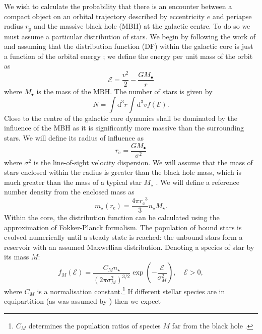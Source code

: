 \documentclass[useAMS,usedcolumn,usegraphicx,usenatbib]{mn2e}
\newcommand{\sub}[1]{\ensuremath{_\mathrm{#1}}}
\newcommand{\dd}{\ensuremath{\mathrm{d}}}
\begin{document}
We wish to calculate the probability that there is an encounter between a compact object on an orbital trajectory described by eccentricity $e$ and periapse radius $r\sub{p}$ and the massive black hole (MBH) at the galactic centre. To do so we must assume a particular distribution of stars. We begin by following the work of \citet{Bahcall1976, Bahcall1977} and assuming that the distribution function (DF) within the galactic core is just a function of the orbital energy \citep{Shapiro1978}; we define the energy per unit mass of the orbit as
\begin{equation}
\mathcal{E} = \frac{v^2}{2} - \frac{GM_\bullet}{r}
\end{equation}
where $M_\bullet$ is the mass of the MBH. The number of stars is given by
\begin{equation}
N = \int \dd^3r \int \dd^3v f(\mathcal{E}).
\end{equation}
Close to the centre of the galactic core dynamics shall be dominated by the influence of the MBH as it is significantly more massive than the surrounding stars. We will define its radius of influence as \citep{Frank1976}
\begin{equation}
r\sub{c} = \frac{GM_\bullet}{\sigma^2}
\label{eq:r_c}
\end{equation}
where $\sigma^2$ is the line-of-sight velocity dispersion. We will assume that the mass of stars enclosed within the radius is greater than the black hole mass, which is much greater than the mass of a typical star $M_\star$ \citep{Bahcall1976}. We will define a reference number density from the enclosed mass as
\begin{equation}
m_\star(r\sub{c}) = \frac{4\pi r\sub{c}^3}{3}n_\star M_\star.
\end{equation}
Within the core, the distribution function can be calculated using the approximation of Fokker-Planck formalism. The population of bound stars is evolved numerically until a steady state is reached: the unbound stars form a reservoir with an assumed Maxwellian distribution. Denoting a species of star by its mass $M$:
\begin{equation}
f_M(\mathcal{E}) = \frac{C_M n_\star}{(2\pi\sigma_M^2)^{3/2}} \exp\left(-\frac{\mathcal{E}}{\sigma_M^2}\right),\quad\mathcal{E} > 0,
\label{eq:Unbound_DF}
\end{equation}
where $C_M$ is a normalisation constant.\footnote{$C_M$ determines the population ratios of species $M$ far from the black hole \citep{Alexander2009}.} If different stellar species are in equipartition (as was assumed by \citealt{Bahcall1976, Bahcall1977}) then we expect
\end{document}

